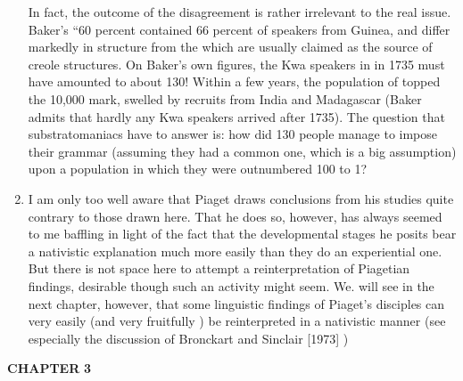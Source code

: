 \begin{enumerate}
In fact, the outcome of the disagreement is rather irrelevant to
the real issue. Baker's ``60 percent contained 66 percent of speakers from Guinea, and  differ markedly in structure from the  which are usually claimed as the source of creole structures. On Baker's own figures, the Kwa speakers in  in 1735 must have amounted to about 130! Within a few years, the population of  topped the 10,000 mark, swelled by recruits from India and Madagascar (Baker admits that hardly any Kwa speakers arrived after 1735). The question that substratomaniacs have to answer is: how did 130 people manage to impose their grammar (assuming they had a common one, which is a big assumption) upon a population in which they were outnumbered 100 to 1?


\item I am only too well aware that Piaget draws conclusions from
his studies quite contrary to those drawn here. That he does so, how\-ever, has always seemed to me baffling in light of the fact that the developmental stages he posits bear a nativistic explanation much more
easily than they do an experiential one. But there is not space here to attempt a reinterpretation of Piagetian findings, desirable though such an activity might seem. We. will see in the next chapter, however, that some linguistic findings of Piaget's disciples can very easily (and very fruitfully ) be reinterpreted in a nativistic manner (see especially the discussion of Bronckart and Sinclair [1973] ) 

\end{enumerate}
\textbf{CHAPTER} \textbf{3}


